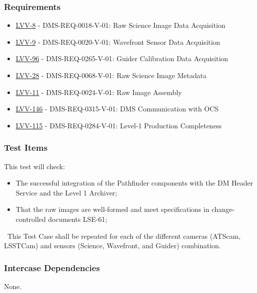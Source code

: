 \subsubsection{Requirements}
\begin{itemize}
\item \href{https://jira.lsstcorp.org/browse/LVV-8}{LVV-8} - DMS-REQ-0018-V-01: Raw Science Image Data Acquisition
\item \href{https://jira.lsstcorp.org/browse/LVV-9}{LVV-9} - DMS-REQ-0020-V-01: Wavefront Sensor Data Acquisition
\item \href{https://jira.lsstcorp.org/browse/LVV-96}{LVV-96} - DMS-REQ-0265-V-01: Guider Calibration Data Acquisition
\item \href{https://jira.lsstcorp.org/browse/LVV-28}{LVV-28} - DMS-REQ-0068-V-01: Raw Science Image Metadata
\item \href{https://jira.lsstcorp.org/browse/LVV-11}{LVV-11} - DMS-REQ-0024-V-01: Raw Image Assembly
\item \href{https://jira.lsstcorp.org/browse/LVV-146}{LVV-146} - DMS-REQ-0315-V-01: DMS Communication with OCS
\item \href{https://jira.lsstcorp.org/browse/LVV-115}{LVV-115} - DMS-REQ-0284-V-01: Level-1 Production Completeness
\end{itemize}

\subsubsection{Test Items}
This test will check:\\

\begin{itemize}
\tightlist
\item
  The successful integration of the Pathfinder components with the DM
  Header Service and the Level 1 Archiver;
\item
  That the raw images are well-formed and meet specifications in
  change-controlled documents LSE-61;
\end{itemize}

~This Test Case shall be repeated for each of the different cameras
(ATScam, LSSTCam) and sensors (Science, Wavefront, and Guider)
combination.



\subsubsection{Intercase Dependencies}
None.



